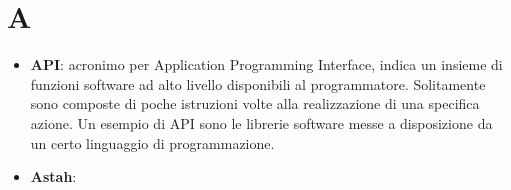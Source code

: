 \section{A}
\begin{itemize}
	\item
	\textbf{API}: acronimo per Application Programming Interface, indica un insieme di funzioni software ad alto livello disponibili al programmatore. Solitamente sono composte di poche istruzioni volte alla realizzazione di una specifica azione. Un esempio di API sono le librerie software messe a disposizione da un certo linguaggio di programmazione.
	\item 
	\textbf{Astah}:
\end{itemize}
